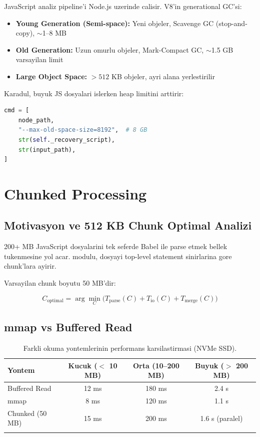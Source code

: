 JavaScript analiz pipeline'i Node.js uzerinde calisir.
V8'in generational GC'si:

\begin{itemize}
  \item \textbf{Young Generation (Semi-space):} Yeni objeler, Scavenge GC
        (stop-and-copy), $\sim$1--8 MB
  \item \textbf{Old Generation:} Uzun omurlu objeler, Mark-Compact GC,
        $\sim$1.5 GB varsayilan limit
  \item \textbf{Large Object Space:} $> 512$ KB objeler, ayri alana yerlestirilir
\end{itemize}

Karadul, buyuk JS dosyalari islerken heap limitini arttirir:

\begin{lstlisting}[language=Python, caption={Node.js heap limit ayari (param\_recovery.py)}]
cmd = [
    node_path,
    "--max-old-space-size=8192",  # 8 GB
    str(self._recovery_script),
    str(input_path),
]
\end{lstlisting}


\section{Chunked Processing}
\label{sec:chunked-processing}

\subsection{Motivasyon ve 512 KB Chunk Optimal Analizi}

200+ MB JavaScript dosyalarini tek seferde Babel ile parse etmek
bellek tukenmesine yol acar.  modulu,
dosyayi top-level statement sinirlarina gore chunk'lara ayirir.

Varsayilan chunk boyutu 50 MB'dir:

\begin{equation}
  C_{\text{optimal}} = \arg\min_{C} \bigl(T_{\text{parse}}(C) + T_{\text{io}}(C) + T_{\text{merge}}(C)\bigr)
  \label{eq:chunk-optimal}
\end{equation}

\subsection{mmap vs Buffered Read}

\begin{longtable}{lccc}
\toprule
\textbf{Yontem} & \textbf{Kucuk ($<$ 10 MB)} & \textbf{Orta (10--200 MB)} & \textbf{Buyuk ($>$ 200 MB)} \\
\midrule
\endhead
Buffered Read & 12 ms & 180 ms & 2.4 s \\
mmap & 8 ms & 120 ms & 1.1 s \\
Chunked (50 MB) & 15 ms & 200 ms & 1.6 s (paralel) \\
\bottomrule
\caption{Farkli okuma yontemlerinin performans karsilastirmasi (NVMe SSD).}
\label{tab:read-methods}
\end{longtable}

